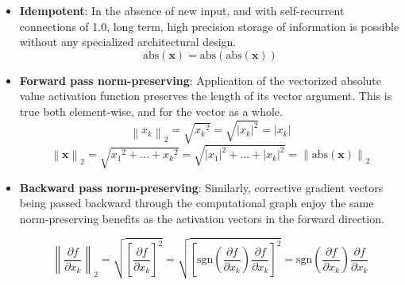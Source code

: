 \documentclass{article}
\begin{document}
\begin{itemize}
\item \textbf{Idempotent}: In the absence of new input, and with self-recurrent connections of 1.0, long term, high precision storage of information is possible without any specialized architectural design.
\begin{equation}
\textrm{abs}(\mathbf{x}) =
\textrm{abs}(\textrm{abs}(\mathbf{x}))
\end{equation}
\item \textbf{Forward pass norm-preserving}: Application of the vectorized absolute value activation function preserves the length of its vector argument. This is true both element-wise, and for the vector as a whole.
\begin{equation}
{\left \| x_k \right \|}_2 = 
\sqrt{{x_k}^{2}} = 
\sqrt{{ | x_k | }^{2}} = 
| x_k |
\end{equation}
\begin{equation}
{\left \| \mathbf{x} \right \|}_2 = 
\sqrt{{x_1}^{2} + \dots + {x_k}^2} = 
\sqrt{{|x_1|}^{2} + \dots + {|x_k|}^2} =
{\left \| \textrm{abs}( \mathbf{x} ) \right \|}_2
\end{equation}
\item \textbf{Backward pass norm-preserving}: Similarly, corrective gradient vectors being passed backward through the computational graph enjoy the same norm-preserving benefits as the activation vectors in the forward direction.

\begin{equation}
{\left \| {\frac{\partial f}{\partial x_k}} \right \|}_2 = 
\sqrt{{ \left [ \frac{\partial f}{\partial x_k} \right ] }^{2}} = 
\sqrt{{ \left [ \textrm{sgn} \left ( \frac{\partial f}{\partial x_k} \right ) \frac{\partial f}{\partial x_k} \right ] }^{2}} = 
\textrm{sgn} \left ( \frac{\partial f}{\partial x_k} \right ) \frac{\partial f}{\partial x_k}
\end{equation}


\end{itemize}
\end{document}
